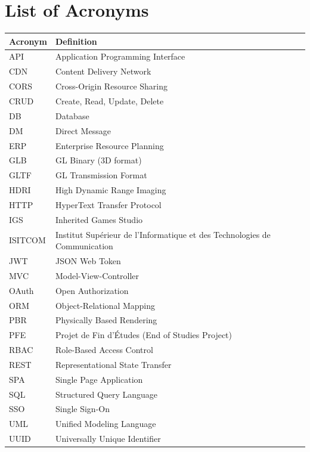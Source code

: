 \documentclass[12pt, a4paper, oneside]{report}
\begin{document}
\restoregeometry
\setcounter{page}{1}




\etocstandardlines
\tableofcontents
\clearpage

\listoffigures
{}
\clearpage

\listoftables
{}
\clearpage

\chapter*{List of Acronyms}
\begin{tabular}{L{3cm} L{12cm}}
\toprule
\textbf{Acronym} & \textbf{Definition} \\
\midrule
API    & Application Programming Interface \\
CDN    & Content Delivery Network \\
CORS   & Cross-Origin Resource Sharing \\
CRUD   & Create, Read, Update, Delete \\
DB     & Database \\
DM     & Direct Message \\
ERP    & Enterprise Resource Planning \\
GLB    & GL Binary (3D format) \\
GLTF   & GL Transmission Format \\
HDRI   & High Dynamic Range Imaging \\
HTTP   & HyperText Transfer Protocol \\
IGS    & Inherited Games Studio \\
ISITCOM & Institut Supérieur de l'Informatique et des Technologies de Communication \\
JWT    & JSON Web Token \\
MVC    & Model-View-Controller \\
OAuth  & Open Authorization \\
ORM    & Object-Relational Mapping \\
PBR    & Physically Based Rendering \\
PFE    & Projet de Fin d'Études (End of Studies Project) \\
RBAC   & Role-Based Access Control \\
REST   & Representational State Transfer \\
SPA    & Single Page Application \\
SQL    & Structured Query Language \\
SSO    & Single Sign-On \\
UML    & Unified Modeling Language \\
UUID   & Universally Unique Identifier \\
\bottomrule
\end{tabular}
\end{document}

